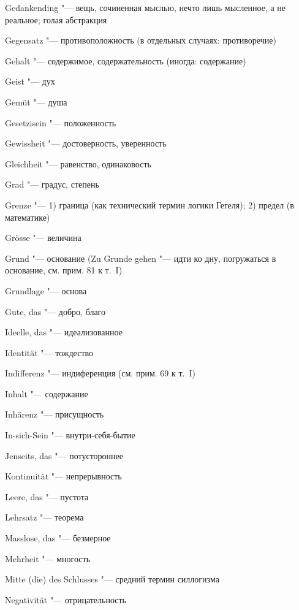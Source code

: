 \begin{multicols}{2}
\bigskip

Gedankending "--- вещь, сочиненная мыслью, нечто лишь мысленное,
а не реальное; голая абстракция

Gegensatz "--- противоположность (в отдельных случаях:
противоречие)

Gehalt "--- содержимое, содержательность (иногда: содержание)

Geist "--- дух

Gemüt "--- душа

Gesetzisein "--- положенность

Gewissheit "--- достоверность, уверенность

Gleichheit "--- равенство, одинаковость

Grad "--- градус, степень

Grenze "--- 1) граница (как технический термин логики Гегеля); 2) предел
(в математике)

Grösse "--- величина

Grund "--- основание (Zu Grunde gehen "--- идти ко дну, погружаться в основание,
см. прим. 81 к т.~I)

Grundlage "--- основа

Gute, das "--- добро, благо

\bigskip

Ideelle, das "--- идеализованное

Identität "--- тождество

Indifferenz "--- индиференция (см. прим. 69 к т.~I)

Inhalt "--- содержание

Inhärenz "--- присущность

In-sich-Sein "--- внутри-себя-бытие

\bigskip

Jenseits, das "--- потустороннее

\bigskip

Kontinuität "--- непрерывность

\bigskip

Leere, das "--- пустота

Lehrsatz "--- теорема

\bigskip

Masslose, das "--- безмерное

Mehrheit "--- многость

Mitte (die) des Schlusses "--- средний термин силлогизма

\bigskip

Negativität "--- отрицательность


\end{multicols}
